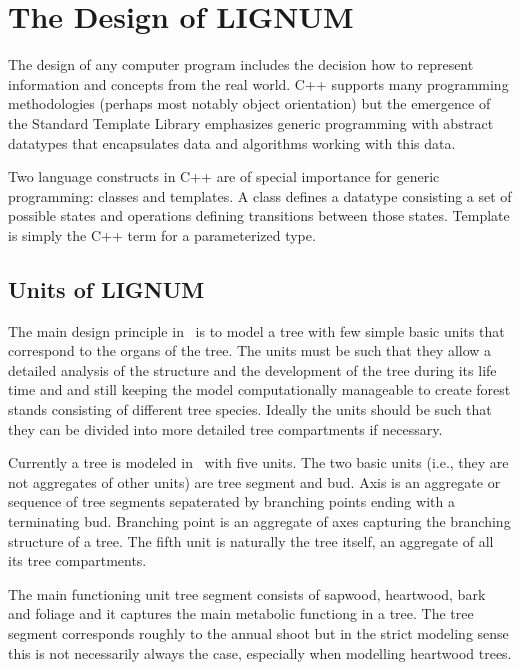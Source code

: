 \section{The Design of LIGNUM}

The  design of  any  computer  program includes  the  decision how  to
represent information  and concepts from the real  world. C++ supports
many   programming   methodologies   (perhaps  most   notably   object
orientation)  but  the  emergence  of the  Standard  Template  Library
emphasizes   generic   programming   with  abstract   datatypes   that
encapsulates data and algorithms  working with this data. 

Two language  constructs in C++ are  of special importance for generic
programming: classes  and   templates.   A class  defines   a datatype
consisting   a  set of   possible   states  and  operations   defining
transitions between those states. Template  is simply the C++ term for
a parameterized type.

\subsection{Units of LIGNUM} 

The main design  principle in  \lignum\ is to   model a tree with  few
simple  basic units  that correspond to   the organs of  the tree. The
units must  be   such that  they allow   a  detailed analysis  of  the
structure and the development of the tree during its life time and and
still keeping  the  model computationally manageable to  create forest
stands consisting of different tree species.  Ideally the units should
be such that they can be divided  into more detailed tree compartments
if necessary.

Currently a tree is modeled in \lignum\ with five units.  The two basic
units (i.e., they are not aggregates of  other units) are tree segment
and  bud.    Axis  is an   aggregate  or  sequence  of   tree segments
sepaterated  by  branching   points    ending  with    a   terminating
bud. Branching point is an aggregate of axes capturing the branching
structure of a tree.  The fifth unit is naturally  the tree itself, an
aggregate of all its tree compartments.

The main functioning unit tree segment consists of sapwood, heartwood,
bark and  foliage and it  captures the main  metabolic functiong  in a
tree.  The tree segment corresponds roughly to the annual shoot but in
the   strict modeling sense this is   not necessarily always the case,
especially when modelling heartwood trees.

